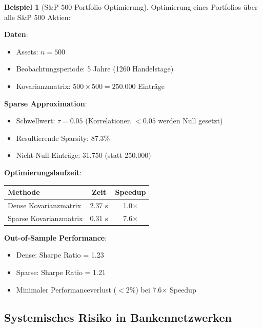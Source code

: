 \documentclass[a4paper,12pt]{report}
\theoremstyle{definition}
\newtheorem{beispiel}{Beispiel}
\begin{document}
	\begin{beispiel}[S\&P 500 Portfolio-Optimierung]
		Optimierung eines Portfolios über alle S\&P 500 Aktien:
		
		\textbf{Daten}:
		\begin{itemize}
			\item Assets: $n = 500$
			\item Beobachtungsperiode: 5 Jahre (1260 Handelstage)
			\item Kovarianzmatrix: $500 \times 500 = 250.000$ Einträge
		\end{itemize}
		
		\textbf{Sparse Approximation}:
		\begin{itemize}
			\item Schwellwert: $\tau = 0.05$ (Korrelationen $< 0.05$ werden Null gesetzt)
			\item Resultierende Sparsity: 87.3\%
			\item Nicht-Null-Einträge: 31.750 (statt 250.000)
		\end{itemize}
		
		\textbf{Optimierungslaufzeit}:
		\begin{center}
			\begin{tabular}{|l|c|c|}
				\hline
				\textbf{Methode} & \textbf{Zeit} & \textbf{Speedup} \\
				\hline
				Dense Kovarianzmatrix & 2.37 s & 1.0$\times$ \\
				Sparse Kovarianzmatrix & 0.31 s & 7.6$\times$ \\
				\hline
			\end{tabular}
		\end{center}
		
		\textbf{Out-of-Sample Performance}:
		\begin{itemize}
			\item Dense: Sharpe Ratio = 1.23
			\item Sparse: Sharpe Ratio = 1.21
			\item Minimaler Performanceverlust ($< 2\%$) bei 7.6$\times$ Speedup
		\end{itemize}
	\end{beispiel}
	
	\subsection{Systemisches Risiko in Bankennetzwerken}
	
\end{document}
